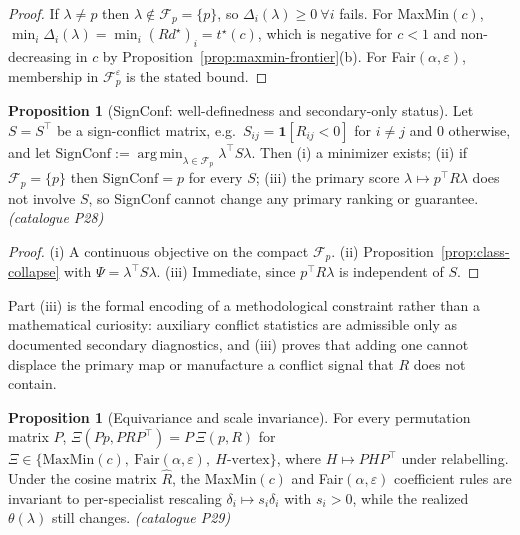 \documentclass[12pt,a4paper]{report}
\newcommand{\1}{\mathbf{1}}
\newcommand{\Floor}{\mathcal{F}_{p}}
\DeclareMathOperator*{\argmin}{arg\,min}
\theoremstyle{definition}
\newtheorem{proposition}[definition]{Proposition}
\begin{document}
\begin{proof}
If \(\lambda\ne p\) then \(\lambda\notin\Floor=\{p\}\), so \(\Delta_i(\lambda)\ge0\ \forall i\) fails. For MaxMin\((c)\), \(\min_i\Delta_i(\lambda)=\min_i(Rd^\star)_i=t^\star(c)\), which is negative for \(c<1\) and non-decreasing in \(c\) by Proposition~\ref{prop:maxmin-frontier}(b). For Fair\((\alpha,\varepsilon)\), membership in \(\Floor^\varepsilon\) is the stated bound.
\end{proof}

\begin{proposition}[SignConf: well-definedness and secondary-only status]
\label{prop:signconf}
Let \(S=S^\top\) be a sign-conflict matrix, e.g.\ \(S_{ij}=\1[R_{ij}<0]\) for \(i\ne j\) and \(0\) otherwise, and let \(\mathrm{SignConf}:=\argmin_{\lambda\in\Floor}\lambda^\top S\lambda\). Then (i) a minimizer exists; (ii) if \(\Floor=\{p\}\) then \(\mathrm{SignConf}=p\) for every \(S\); (iii) the primary score \(\lambda\mapsto p^\top R\lambda\) does not involve \(S\), so SignConf cannot change any primary ranking or guarantee. \emph{(catalogue P28)}
\end{proposition}

\begin{proof}
(i) A continuous objective on the compact \(\Floor\). (ii) Proposition~\ref{prop:class-collapse} with \(\Psi=\lambda^\top S\lambda\). (iii) Immediate, since \(p^\top R\lambda\) is independent of \(S\).
\end{proof}

Part (iii) is the formal encoding of a methodological constraint rather than a mathematical curiosity: auxiliary conflict statistics are admissible only as documented secondary diagnostics, and (iii) proves that adding one cannot displace the primary map or manufacture a conflict signal that \(R\) does not contain.

\begin{proposition}[Equivariance and scale invariance]
\label{prop:equivariance}
For every permutation matrix \(P\), \(\Xi(Pp,PRP^\top)=P\,\Xi(p,R)\) for \(\Xi\in\{\mathrm{MaxMin}(c),\ \mathrm{Fair}(\alpha,\varepsilon),\ H\text{-vertex}\}\), where \(H\mapsto PHP^\top\) under relabelling. Under the cosine matrix \(\hat R\), the MaxMin\((c)\) and Fair\((\alpha,\varepsilon)\) coefficient rules are invariant to per-specialist rescaling \(\delta_i\mapsto s_i\delta_i\) with \(s_i>0\), while the realized \(\theta(\lambda)\) still changes. \emph{(catalogue P29)}
\end{proposition}
\end{document}
